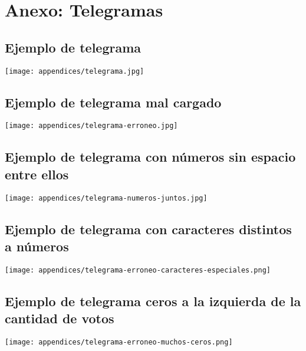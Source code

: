 \chapter{Anexo: Telegramas}

\section{Ejemplo de telegrama}
\label{anexo:telegrama}

\texttt{[image: appendices/telegrama.jpg]}

\section{Ejemplo de telegrama mal cargado}
\label{anexo:telegrama-erroneo}

\texttt{[image: appendices/telegrama-erroneo.jpg]}

\section{Ejemplo de telegrama con números sin espacio entre ellos}
\label{anexo:telegrama-numeros-juntos}

\texttt{[image: appendices/telegrama-numeros-juntos.jpg]}

\section{Ejemplo de telegrama con caracteres distintos a números}
\label{anexo:telegrama-erroneo-caracteres-especiales}

\texttt{[image: appendices/telegrama-erroneo-caracteres-especiales.png]}

\section{Ejemplo de telegrama ceros a la izquierda de la cantidad de votos}
\label{anexo:telegrama-erroneo-muchos-ceros}

\texttt{[image: appendices/telegrama-erroneo-muchos-ceros.png]}
